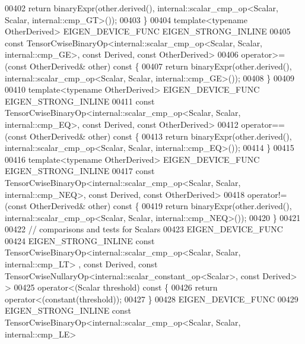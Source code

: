\begin{DoxyCode}
00402       \textcolor{keywordflow}{return} binaryExpr(other.derived(), internal::scalar\_cmp\_op<Scalar, Scalar, internal::cmp\_GT>());
00403     \}
00404     \textcolor{keyword}{template}<\textcolor{keyword}{typename} OtherDerived> EIGEN\_DEVICE\_FUNC EIGEN\_STRONG\_INLINE
00405     \textcolor{keyword}{const} TensorCwiseBinaryOp<internal::scalar\_cmp\_op<Scalar, Scalar, internal::cmp\_GE>, \textcolor{keyword}{const} Derived, \textcolor{keyword}{
      const} OtherDerived>
00406     operator>=(\textcolor{keyword}{const} OtherDerived& other)\textcolor{keyword}{ const }\{
00407       \textcolor{keywordflow}{return} binaryExpr(other.derived(), internal::scalar\_cmp\_op<Scalar, Scalar, internal::cmp\_GE>());
00408     \}
00409 
00410     \textcolor{keyword}{template}<\textcolor{keyword}{typename} OtherDerived> EIGEN\_DEVICE\_FUNC EIGEN\_STRONG\_INLINE
00411     \textcolor{keyword}{const} TensorCwiseBinaryOp<internal::scalar\_cmp\_op<Scalar, Scalar, internal::cmp\_EQ>, \textcolor{keyword}{const} Derived, \textcolor{keyword}{
      const} OtherDerived>
00412     operator==(\textcolor{keyword}{const} OtherDerived& other)\textcolor{keyword}{ const }\{
00413       \textcolor{keywordflow}{return} binaryExpr(other.derived(), internal::scalar\_cmp\_op<Scalar, Scalar, internal::cmp\_EQ>());
00414     \}
00415 
00416     \textcolor{keyword}{template}<\textcolor{keyword}{typename} OtherDerived> EIGEN\_DEVICE\_FUNC EIGEN\_STRONG\_INLINE
00417     \textcolor{keyword}{const} TensorCwiseBinaryOp<internal::scalar\_cmp\_op<Scalar, Scalar, internal::cmp\_NEQ>, \textcolor{keyword}{const} Derived, \textcolor{keyword}{
      const} OtherDerived>
00418     operator!=(\textcolor{keyword}{const} OtherDerived& other)\textcolor{keyword}{ const }\{
00419       \textcolor{keywordflow}{return} binaryExpr(other.derived(), internal::scalar\_cmp\_op<Scalar, Scalar, internal::cmp\_NEQ>());
00420     \}
00421 
00422     \textcolor{comment}{// comparisons and tests for Scalars}
00423     EIGEN\_DEVICE\_FUNC
00424     EIGEN\_STRONG\_INLINE \textcolor{keyword}{const} TensorCwiseBinaryOp<internal::scalar\_cmp\_op<Scalar, Scalar, internal::cmp\_LT>
      , \textcolor{keyword}{const} Derived, \textcolor{keyword}{const} TensorCwiseNullaryOp<internal::scalar\_constant\_op<Scalar>, \textcolor{keyword}{const} Derived> >
00425     operator<(Scalar threshold)\textcolor{keyword}{ const }\{
00426       \textcolor{keywordflow}{return} operator<(constant(threshold));
00427     \}
00428     EIGEN\_DEVICE\_FUNC
00429     EIGEN\_STRONG\_INLINE \textcolor{keyword}{const} TensorCwiseBinaryOp<internal::scalar\_cmp\_op<Scalar, Scalar, internal::cmp\_LE>

\end{DoxyCode}
